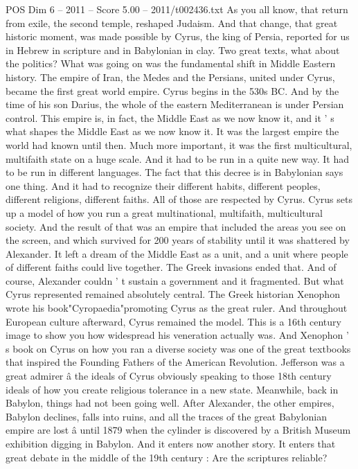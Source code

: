 \begin{textsample}{POS Dim 6 – 2011 – Score 5.00 – 2011/t002436.txt}
As you all know, that return from exile, the second temple, reshaped Judaism.
And that change, that great historic moment, was made possible by Cyrus, the king of Persia, reported for us in Hebrew in scripture and in Babylonian in clay.
Two great texts, what about the politics?
What was going on was the fundamental shift in Middle Eastern history.
The empire of Iran, the Medes and the Persians, united under Cyrus, became the first great world empire.
Cyrus begins in the 530s BC.
And by the time of his son Darius, the whole of the eastern Mediterranean is under Persian control.
This empire is, in fact, the Middle East as we now know it, and it ' s what shapes the Middle East as we now know it.
It was the largest empire the world had known until then.
Much more important, it was the first multicultural, multifaith state on a huge scale.
And it had to be run in a quite new way.
It had to be run in different languages.
The fact that this decree is in Babylonian says one thing.
And it had to recognize their different habits, different peoples, different religions, different faiths.
All of those are respected by Cyrus.
Cyrus sets up a model of how you run a great multinational, multifaith, multicultural society.
And the result of that was an empire that included the areas you see on the screen, and which survived for 200 years of stability until it was shattered by Alexander.
It left a dream of the Middle East as a unit, and a unit where people of different faiths could live together.
The Greek invasions ended that.
And of course, Alexander couldn ' t sustain a government and it fragmented.
But what Cyrus represented remained absolutely central.
The Greek historian Xenophon wrote his book"Cyropaedia"promoting Cyrus as the great ruler.
And throughout European culture afterward, Cyrus remained the model.
This is a 16th century image to show you how widespread his veneration actually was.
And Xenophon ' s book on Cyrus on how you ran a diverse society was one of the great textbooks that inspired the Founding Fathers of the American Revolution.
Jefferson was a great admirer â the ideals of Cyrus obviously speaking to those 18th century ideals of how you create religious tolerance in a new state.
Meanwhile, back in Babylon, things had not been going well.
After Alexander, the other empires, Babylon declines, falls into ruins, and all the traces of the great Babylonian empire are lost â until 1879 when the cylinder is discovered by a British Museum exhibition digging in Babylon.
And it enters now another story.
It enters that great debate in the middle of the 19th century : Are the scriptures reliable?

\end{textsample}
